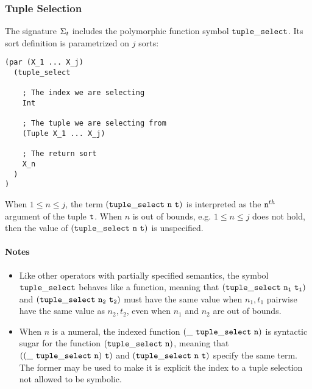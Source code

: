 \documentclass[english,a4paper,10pt]{article}
\begin{document}
\subsubsection{Tuple Selection}
The signature $\Sigma_{t}$ includes 
the polymorphic function symbol ${\tt tuple\_select}$.
Its sort definition is parametrized on $j$ sorts:
\begin{verbatim}
(par (X_1 ... X_j) 
  (tuple_select
    
    ; The index we are selecting 
    Int
    
    ; The tuple we are selecting from
    (Tuple X_1 ... X_j)
    
    ; The return sort
    X_n
  )
)
\end{verbatim}
When $1 \leq n \leq j$,
the term $\syntax{(tuple\_select\ n\ t)}$ is
interpreted as the ${\tt n}^{th}$ argument of the tuple ${\tt t}$.
When $n$ is out of bounds, e.g. $1 \leq n \leq j$ does not hold,
then the value of $\syntax{(tuple\_select\ n\ t)}$ is unspecified.

\paragraph{Notes}
\begin{itemize}
\item Like other operators with partially specified semantics,
the symbol ${\tt tuple\_select}$ behaves like a function, meaning
that ${\tt (tuple\_select\ n_1\ t_1)}$ and  ${\tt (tuple\_select\ n_2\ t_2)}$
must have the same value when $n_1, t_1$ pairwise have the same value as $n_2, t_2$,
even when $n_1$ and $n_2$ are out of bounds.
\item When $n$ is a numeral, the indexed function
${\tt (\_\ tuple\_select\ n)}$ is syntactic sugar for the function
${\tt (tuple\_select\ n)}$, meaning that ${\tt ((\_\ tuple\_select\ n)\ t)}$
and $\syntax{(tuple\_select\ n\ t)}$ specify the same term.
The former may be used to make it is explicit the index to a tuple selection
not allowed to be symbolic.
\end{itemize}
\end{document}
